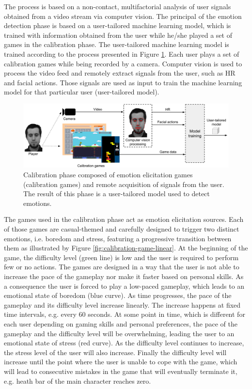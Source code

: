 The process is based on a non-contact, multifactorial analysis of user signals obtained from a video stream via computer vision. The principal of the emotion detection phase is based on a user-tailored machine learning model, which is trained with information obtained from the user while he/she played a set of games in the calibration phase. The user-tailored machine learning model is trained according to the process presented in Figure \ref{fig:user-tailored-calibration}. Each user plays a set of calibration games while being recorded by a camera. Computer vision is used to process the video feed and remotely extract signals from the user, such as HR and facial actions. Those signals are used as input to train the machine learning model for that particular user (user-tailored model).

\begin{figure}[h]
    \centering
    \includegraphics[width=\textwidth]{Content/figures/user-tailored-calibration}
    \caption{Calibration phase composed of emotion elicitation games (calibration games) and remote acquisition of signals from the user. The result of this phase is a user-tailored model used to detect emotions.}
    \label{fig:user-tailored-calibration}
\end{figure}

The games used in the calibration phase act as emotion elicitation sources. Each of those games are casual-themed and carefully designed to trigger two distinct emotions, i.e. boredom and stress, featuring a progressive transition between them as illustrated by Figure \ref{fig:calibration-game-linear}. At the beginning of the game, the difficulty level (green line) is low and the user is required to perform few or no actions. The games are designed in a way that the user is not able to increase the pace of the gameplay nor make it faster based on personal skills. As a consequence the user is forced to play a low-paced gameplay, which leads to an emotional state of boredom (blue curve). As time progresses, the pace of the gameplay and its difficulty level increase linearly. The increase happens at fixed time intervals, e.g. every 60 seconds. At some point in time, which is different for each user depending on gaming skills and personal preferences, the pace of the gameplay and the difficulty level will be overwhelming, leading the user to an emotional state of stress (red curve). As the difficulty level continues to increase, the stress level of the user will also increase. Finally the difficulty level will increase until the point where the user is unable to cope with the game, which will lead to consecutive mistakes in the game that will eventually terminate it, e.g. heath bar of the main character reaches zero.

